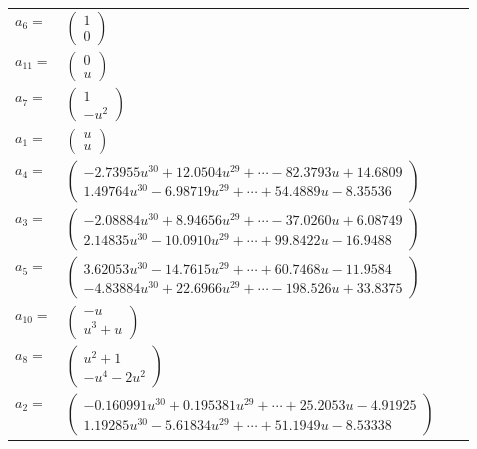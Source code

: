 \documentclass[1p]{elsarticle_modified}
\theoremstyle{definition}
\begin{document}
\begin{tabular}{m{7pt} m{180pt} m{7pt} m{180pt} }
\flushright $a_{6}=$&$\begin{pmatrix}1\\0\end{pmatrix}$ \\
\flushright $a_{11}=$&$\begin{pmatrix}0\\u\end{pmatrix}$ \\
\flushright $a_{7}=$&$\begin{pmatrix}1\\- u^2\end{pmatrix}$ \\
\flushright $a_{1}=$&$\begin{pmatrix}u\\u\end{pmatrix}$ \\
\flushright $a_{4}=$&$\begin{pmatrix}-2.73955 u^{30}+12.0504 u^{29}+\cdots-82.3793 u+14.6809\\1.49764 u^{30}-6.98719 u^{29}+\cdots+54.4889 u-8.35536\end{pmatrix}$ \\
\flushright $a_{3}=$&$\begin{pmatrix}-2.08884 u^{30}+8.94656 u^{29}+\cdots-37.0260 u+6.08749\\2.14835 u^{30}-10.0910 u^{29}+\cdots+99.8422 u-16.9488\end{pmatrix}$ \\
\flushright $a_{5}=$&$\begin{pmatrix}3.62053 u^{30}-14.7615 u^{29}+\cdots+60.7468 u-11.9584\\-4.83884 u^{30}+22.6966 u^{29}+\cdots-198.526 u+33.8375\end{pmatrix}$ \\
\flushright $a_{10}=$&$\begin{pmatrix}- u\\u^3+u\end{pmatrix}$ \\
\flushright $a_{8}=$&$\begin{pmatrix}u^2+1\\- u^4-2 u^2\end{pmatrix}$ \\
\flushright $a_{2}=$&$\begin{pmatrix}-0.160991 u^{30}+0.195381 u^{29}+\cdots+25.2053 u-4.91925\\1.19285 u^{30}-5.61834 u^{29}+\cdots+51.1949 u-8.53338\end{pmatrix}$ \\

\end{tabular}
\end{document}
